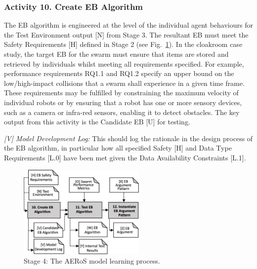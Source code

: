 \documentclass[runningheads]{llncs}
\begin{document}
\subsubsection*{Activity 10. Create EB Algorithm}

The EB algorithm is engineered at the level of the individual agent behaviours for the Test Environment output [N] from Stage 3. The resultant EB must meet the Safety Requirements [H] defined in Stage 2 (see Fig.~\ref{amlas-a-stage4}). 
In the cloakroom case study, the target EB for the swarm must ensure that items are stored and retrieved by individuals whilst meeting all requirements specified. For example, performance requirements RQ1.1 and RQ1.2 specify an upper bound on the low/high-impact collisions that a swarm shall experience in a given time frame. 
These requirements may be fulfilled by constraining the maximum velocity of individual robots or by ensuring that a robot has one or more sensory devices, such as a camera or infra-red sensors, enabling it to detect obstacles. 
The key output from this activity is the Candidate EB [U] for testing.

\emph{[V] Model Development Log:} This should log the rationale in the design process of the EB algorithm, in particular how all specified Safety [H] and Data Type Requirements [L.0] have been met given the Data Availability Constraints [L.1].

\begin{figure}[!t]
	\centering
	\includegraphics[width=0.55\textwidth]{figures/AERoS-Stage4.png}%
	\vspace{-2ex}
	\caption{Stage 4: The AERoS model learning process.}
	\label{amlas-a-stage4}
	\vspace{-4ex}
\end{figure}
\end{document}
